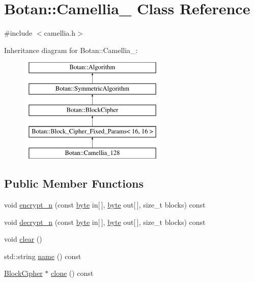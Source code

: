 \hypertarget{classBotan_1_1Camellia__128}{\section{Botan\-:\-:Camellia\-\_ Class Reference}
\label{classBotan_1_1Camellia__128}
}


{\ttfamily \#include $<$camellia.\-h$>$}

Inheritance diagram for Botan\-:\-:Camellia\-\_\-:\begin{figure}[H]
\begin{center}
\leavevmode
\includegraphics[height=5.000000cm]{classBotan_1_1Camellia__128}
\end{center}
\end{figure}
\subsection*{Public Member Functions}
\begin{DoxyCompactItemize}
\item 
void \hyperlink{classBotan_1_1Camellia__128_af36f49fdfc833c4504717defa641dbb6}{encrypt\-\_\-n} (const \hyperlink{namespaceBotan_a7d793989d801281df48c6b19616b8b84}{byte} in\mbox{[}$\,$\mbox{]}, \hyperlink{namespaceBotan_a7d793989d801281df48c6b19616b8b84}{byte} out\mbox{[}$\,$\mbox{]}, size\-\_\-t blocks) const 
\item 
void \hyperlink{classBotan_1_1Camellia__128_a4dc258ea0996ea29057196772f79409f}{decrypt\-\_\-n} (const \hyperlink{namespaceBotan_a7d793989d801281df48c6b19616b8b84}{byte} in\mbox{[}$\,$\mbox{]}, \hyperlink{namespaceBotan_a7d793989d801281df48c6b19616b8b84}{byte} out\mbox{[}$\,$\mbox{]}, size\-\_\-t blocks) const 
\item 
void \hyperlink{classBotan_1_1Camellia__128_ae7b1aca559ce43edad302b563ab44e52}{clear} ()
\item 
std\-::string \hyperlink{classBotan_1_1Camellia__128_ab19c509ffa98d476b9cf3d8332a6cb36}{name} () const 
\item 
\hyperlink{classBotan_1_1BlockCipher}{Block\-Cipher} $\ast$ \hyperlink{classBotan_1_1Camellia__128_a8dd1f0072d2b386b77f1562ab00b6e76}{clone} () const 
\end{DoxyCompactItemize}
